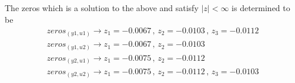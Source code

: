 The zeros which is a solution to the above and satisfy $|z|<\infty$ is determined to be
\begin{equation}
    \begin{gathered}
        zeros_{(y1,u1)}\xrightarrow{}z_1=-0.0067\,,\,z_2=-0.0103\,,\,z_3=-0.0112\\
        zeros_{(y1,u2)}\xrightarrow{}z_1=-0.0067\,,\,z_2=-0.0103\\
        zeros_{(y2,u1)}\xrightarrow{}z_1=-0.0075\,,\,z_2=-0.0112\\
        zeros_{(y2,u2)}\xrightarrow{}z_1=-0.0075\,,\,z_2=-0.0112\,,\,z_3=-0.0103
    \end{gathered}
\end{equation}